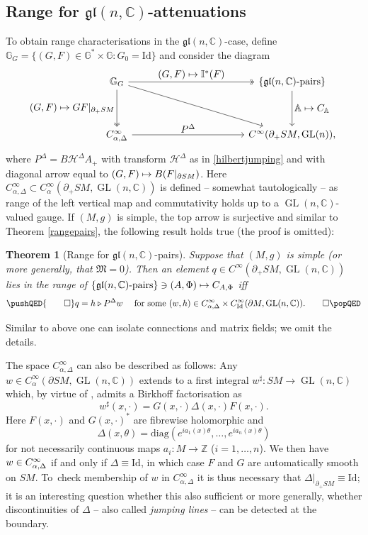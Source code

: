 \documentclass[JEP,XML,SOM,Unicode,published]{cedram}
\newcommand\mto{\mathchoice{\longmapsto}{\mapsto}{\mapsto}{\mapsto}}
\let\ts\textstyle
\DeclareMathOperator{\GL}{GL}
\theoremstyle{plain}
\newtheorem{theorem}{Theorem}[section]
\theoremstyle{definition}
\newcommand{\A}{\mathbb{A}}
\newcommand{\G}{\mathbb{G}}
\newcommand{\I}{\mathbb{I}}
\newcommand{\Z}{\mathbb{Z}}
\newcommand{\C}{\mathbb{C}}
\renewcommand{\H}{\mathcal{H}}
\newcommand{\M}{\mathfrak{M}}
\newcommand{\gl}{\mathfrak{gl}}
\newcommand{\Id}{\mathrm{Id}}
\newcommand{\1}{{\bf 1}}
\let\lact\triangleright
\begin{document}
\subsection{Range for $\gl(n,\C)$-attenuations}
To obtain range characterisations in the $\gl(n,\C)$-case, define $\G_G=\{(G,F)\in \G^*\times \G: G_0=\Id\}$ and consider the diagram
\begin{equation}\label{magicdiagram5}
\begin{tikzcd}[row sep=huge,column sep=4cm]
\G_G\arrow[two heads]{r}{\ts(G,F)\mto \I^*(F)} \arrow{dr}\arrow[swap, two heads]{d}{\ts(G,F)\mto GF\vert_{\partial_+SM}} & \{\gl(n,\C)\text{-pairs}\} \arrow{d}{\ts\A\mto C_\A} \\
C_{\alpha,\Delta}^\infty \arrow{r}{\ts P^\Delta} & C^\infty(\partial_+SM,\GL(n)),
\end{tikzcd}
\end{equation}
where $P^\Delta = B\H^\Delta A_+$ with transform $\H^\Delta$ as in \eqref{hilbertjumping}
and with diagonal arrow equal to $(G,F)\mto B(F\vert_{\partial SM})$. Here $C_{\alpha,\Delta}^\infty\subset C_{\alpha}^\infty(\partial_+SM,\GL(n,\C))$ is defined -- somewhat tautologically -- as range of the left vertical map and commutativity holds up to a $\GL(n,\C)$-valued gauge. If $(M,g)$ is simple, the top arrow is surjective and similar to Theorem \ref{rangepairs}, the following result holds true (the proof is omitted):
\begin{theorem}[Range for $\gl(n,\C)$-pairs]\label{rangeglpairs} Suppose that $(M,g)$ is simple (or more generally, that $\M =0$). Then an element $q\in C^\infty(\partial_+SM,\GL(n,\C))$ lies in the range of $\{\gl(n,\C)\text{-pairs}\}\ni (A,\Phi)\mto C_{A,\Phi}$ iff
\begin{equation*} \pushQED{\qed}
q=h\lact P^\Delta w\quad
\text{ for some } (w,h)\in C_{\alpha,\Delta}^\infty \times C^\infty_\Id(\partial M,\GL(n,\C)). \qedhere \popQED
\end{equation*}
\end{theorem}
Similar to above one can isolate connections and matrix fields; we omit the details.

\smallskip

The space $C_{\alpha,\Delta}^\infty$ can also be described as follows: Any $w\in C^\infty_\alpha(\partial SM,\GL(n,\C))$ extends to a first integral $w^\sharp:SM\to \GL(n,\C)$ which, by virtue of \cite[Th.\,8.1.2]{PS86}, admits a Birkhoff factorisation as
\begin{equation*}
w^\sharp(x,\cdot) = G(x,\cdot)\Delta(x,\cdot)F(x,\cdot).
\end{equation*}
Here $F(x,\cdot)$ and $G(x,\cdot)^*$ are fibrewise holomorphic and
\[
\Delta(x,\theta)=\mathrm{diag}(e^{ia_1(x)\theta}, \dots, e^{ia_n(x)\theta})
\]
for not necessarily continuous maps $a_i:M\to \Z$ ($i=1,\dots,n$). We then have $w\in\nobreak C_{\alpha,\Delta}^\infty$ if and only if $\Delta \equiv \Id$, in which case $F$ and $G$ are automatically smooth on $SM$. To~check membership of $w$ in $C_{\alpha,\Delta}^\infty$ it is thus necessary that $\Delta\vert_{\partial_+SM}\equiv \Id$; it is an interesting question whether this also sufficient or more generally, whether discontinuities of $\Delta$ -- also called \emph{jumping lines} -- can be detected at the boundary.
\end{document}
